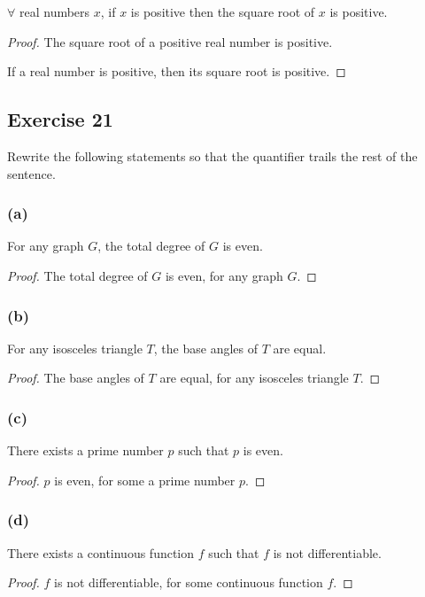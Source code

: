 \documentclass[14pt]{extarticle}
\newcommand{\fa}{\forall}
\begin{document}
$\fa$ real numbers $x$, if $x$ is positive then the square root of $x$ is positive.

\begin{proof}
    The square root of a positive real number is positive.

    If a real number is positive, then its square root is positive.
\end{proof}

\subsection{Exercise 21}
Rewrite the following statements so that the quantifier trails the rest of the sentence.

\subsubsection{(a)}
For any graph $G$, the total degree of $G$ is even.

\begin{proof}
    The total degree of $G$ is even, for any graph $G$.
\end{proof}

\subsubsection{(b)}
For any isosceles triangle $T$, the base angles of $T$ are equal.

\begin{proof}
    The base angles of $T$ are equal, for any isosceles triangle $T$.
\end{proof}

\subsubsection{(c)}
There exists a prime number $p$ such that $p$ is even.

\begin{proof}
    $p$ is even, for some a prime number $p$.
\end{proof}

\subsubsection{(d)}
There exists a continuous function $f$ such that $f$ is not differentiable.

\begin{proof}
    $f$ is not differentiable, for some continuous function $f$.
\end{proof}
\end{document}
